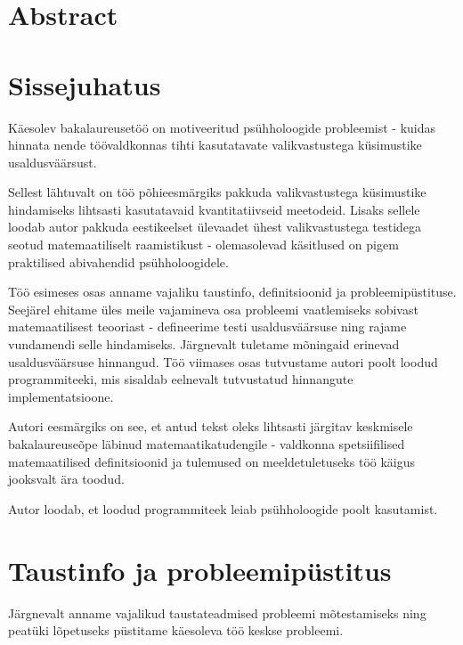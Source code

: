 \documentclass[a4paper,12pt,oneside]{article}
\numberwithin{equation}{section}
\theoremstyle{definition}
\begin{document}
\section*{Abstract}




\tableofcontents

\pagebreak

\section{Sissejuhatus}

Käesolev bakalaureusetöö on motiveeritud psühholoogide probleemist - kuidas hinnata nende töövaldkonnas tihti kasutatavate valikvastustega küsimustike usaldusväärsust. 

Sellest lähtuvalt on töö põhieesmärgiks pakkuda valikvastustega küsimustike hindamiseks lihtsasti kasutatavaid kvantitatiivseid meetodeid. Lisaks sellele loodab autor pakkuda eestikeelset ülevaadet ühest valikvastustega testidega seotud matemaatiliselt raamistikust - olemasolevad käsitlused on pigem praktilised abivahendid psühholoogidele. 

Töö esimeses osas anname vajaliku taustinfo, definitsioonid ja probleemipüstituse. Seejärel ehitame üles meile vajamineva osa probleemi vaatlemiseks sobivast matemaatilisest teooriast - defineerime testi usaldusväärsuse ning rajame vundamendi selle hindamiseks. Järgnevalt tuletame mõningaid erinevad usaldusväärsuse hinnangud. Töö viimases osas tutvustame autori poolt loodud programmiteeki, mis sisaldab eelnevalt tutvustatud hinnangute implementatsioone.

Autori eesmärgiks on see, et antud tekst oleks lihtsasti järgitav keskmisele bakalaureuseõpe läbinud matemaatikatudengile - valdkonna spetsiifilised matemaatilised definitsioonid ja tulemused on meeldetuletuseks töö käigus jooksvalt ära toodud. 

Autor loodab, et loodud programmiteek leiab psühholoogide poolt kasutamist. 






\pagebreak



\section{Taustinfo ja probleemipüstitus}

Järgnevalt anname vajalikud taustateadmised probleemi mõtestamiseks ning peatüki lõpetuseks püstitame käesoleva töö keskse probleemi.
\end{document}
